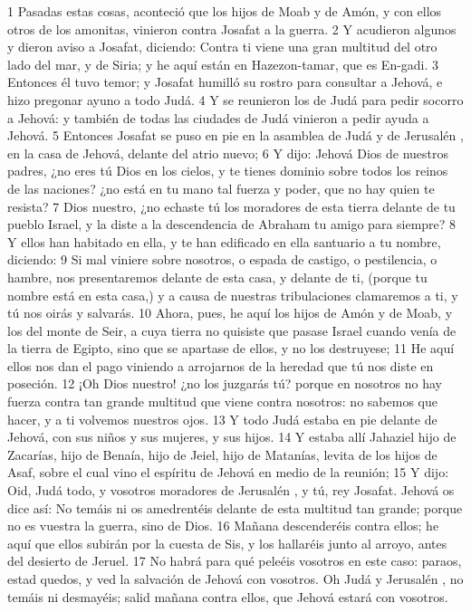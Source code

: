 1 Pasadas estas cosas, aconteció que los hijos de Moab y de Amón, y con ellos otros de los amonitas, vinieron contra Josafat a la guerra.
2 Y acudieron algunos y dieron aviso a Josafat, diciendo: Contra ti viene una gran multitud del otro lado del mar, y de Siria; y he aquí están en Hazezon-tamar, que es En-gadi.
3 Entonces él tuvo temor; y Josafat humilló su rostro para consultar a Jehová, e hizo pregonar ayuno a todo Judá.
4 Y se reunieron los de Judá para pedir socorro a Jehová: y también de todas las ciudades de Judá vinieron a pedir ayuda a Jehová.
5 Entonces Josafat se puso en pie en la asamblea de Judá y de Jerusalén , en la casa de Jehová, delante del atrio nuevo;
6 Y dijo: Jehová Dios de nuestros padres, ¿no eres tú Dios en los cielos, y te tienes dominio sobre todos los reinos de las naciones? ¿no está en tu mano tal fuerza y poder, que no hay quien te resista?
7 Dios nuestro, ¿no echaste tú los moradores de esta tierra delante de tu pueblo Israel, y la diste a la descendencia de Abraham tu amigo para siempre?
8 Y ellos han habitado en ella, y te han edificado en ella santuario a tu nombre, diciendo:
9 Si mal viniere sobre nosotros, o espada de castigo, o pestilencia, o hambre, nos presentaremos delante de esta casa, y delante de ti, (porque tu nombre está en esta casa,) y a causa de nuestras tribulaciones clamaremos a ti, y tú nos oirás y salvarás.
10 Ahora, pues, he aquí los hijos de Amón y de Moab, y los del monte de Seir, a cuya tierra no quisiste que pasase Israel cuando venía de la tierra de Egipto, sino que se apartase de ellos, y no los destruyese;
11 He aquí ellos nos dan el pago viniendo a arrojarnos de la heredad que tú nos diste en poseción.
12 ¡Oh Dios nuestro! ¿no los juzgarás tú? porque en nosotros no hay fuerza contra tan grande multitud que viene contra nosotros: no sabemos que hacer, y a ti volvemos nuestros ojos.
13 Y todo Judá estaba en pie delante de Jehová, con sus niños y sus mujeres, y sus hijos.
14 Y estaba allí Jahaziel hijo de Zacarías, hijo de Benaía, hijo de Jeiel, hijo de Matanías, levita de los hijos de Asaf, sobre el cual vino el espíritu de Jehová en medio de la reunión;
15 Y dijo: Oid, Judá todo, y vosotros moradores de Jerusalén , y tú, rey Josafat. Jehová os dice así: No temáis ni os amedrentéis delante de esta multitud tan grande; porque no es vuestra la guerra, sino de Dios.
16 Mañana descenderéis contra ellos; he aquí que ellos subirán por la cuesta de Sis, y los hallaréis junto al arroyo, antes del desierto de Jeruel.
17 No habrá para qué peleéis vosotros en este caso: paraos, estad quedos, y ved la salvación de Jehová con vosotros. Oh Judá y Jerusalén , no temáis ni desmayéis; salid mañana contra ellos, que Jehová estará con vosotros. 

